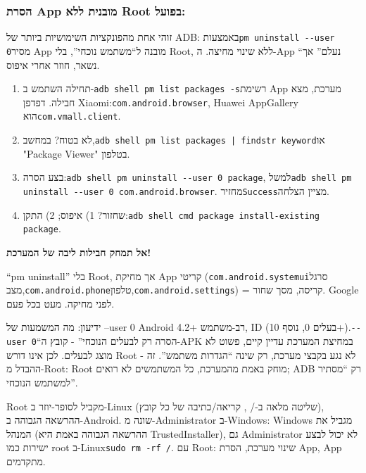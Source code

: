 \subsubsection*{הסרת App מובנית ללא Root בפועל:}

זוהי אחת מהפונקציות השימושיות ביותר של ADB: באמצעות\texttt{pm uninstall -\allowbreak -\allowbreak user 0}מסיר App מובנה ל“משתמש נוכחי”, בלי Root, ללא שינוי מחיצה. ה-App “נעלם” אך נשאר, חוזר אחרי איפוס.

\begin{enumerate}
  \item תחילה השתמש ב-\texttt{adb shell pm list packages -\allowbreak s}רשימת App מערכת, מצא חבילה. דפדפן Xiaomi:\texttt{com.\allowbreak android.\allowbreak browser}, Huawei AppGallery הוא\texttt{com.\allowbreak vmall.\allowbreak client}.
  \item לא בטוח? במחשב,\texttt{adb shell pm list packages | findstr keyword}או "Package Viewer" בטלפון.
  \item בצע הסרה:\texttt{adb shell pm uninstall -\allowbreak -\allowbreak user 0 package}, למשל\texttt{adb shell pm uninstall -\allowbreak -\allowbreak user 0 com.\allowbreak android.\allowbreak browser}. מחזיר\texttt{Success}מציין הצלחה.
  \item שחזור? 1) איפוס; 2) התקן:\texttt{adb shell cmd package install-\allowbreak existing package}.
\end{enumerate}

\textbf{אל תמחק חבילות ליבה של המערכת!}\par

“pm uninstall” בלי Root, אך מחיקת App קריטי (\texttt{com.\allowbreak android.\allowbreak systemui}סרגל מצב,\texttt{com.\allowbreak android.\allowbreak phone}טלפון,\texttt{com.\allowbreak android.\allowbreak settings}) = קריסה, מסך שחור. Google לפני מחיקה. מעט בכל פעם.

\begin{tcbinfo}{ידיעון: מה המשמעות של --user 0}
Android 4.2+ רב-משתמש, ID (בעלים 0, נוסף 10+).\texttt{-\allowbreak -\allowbreak user 0}“הסרה רק לבעלים הנוכחי” - קובץ ה-APK במחיצת המערכת עדיין קיים, פשוט לא מוצג לבעלים. לכן אינו דורש Root - לא נגע בקבצי מערכת, רק שינה “הגדרות משתמש”. זה ההבדל מ-Root: Root מוחק באמת מהמערכת, כל המשתמשים לא רואים; ADB רק “מסתיר למשתמש הנוכחי”.

\end{tcbinfo}


Root מקביל לסופר-יוזר ב-Linux (שליטה מלאה ב-/ , קריאה/כתיבה של כל קובץ), ההרשאה הגבוהה ב-Android. שונה מ-Administrator ב-Windows: Windows מגביל את המנהל (ההרשאה הגבוהה באמת היא TrustedInstaller), גם Administrator לא יכול לבצע ישירות כמו root ב-Linux\texttt{sudo rm -\allowbreak rf /\allowbreak *}. עם Root: שינוי מערכת, הסרת App, App מתקדמים.

